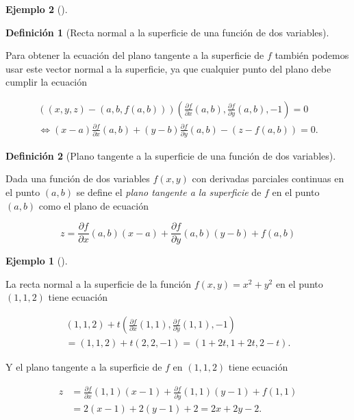 \documentclass[
  a4paper,
]{scrreport}
\theoremstyle{definition}
\newtheorem{example}{Ejemplo}[chapter]
\theoremstyle{plain}
\theoremstyle{definition}
\newtheorem{definition}{Definición}[chapter]
\theoremstyle{definition}
\theoremstyle{plain}
\theoremstyle{plain}
\theoremstyle{remark}
\begin{document}
\begin{example}[]
\begin{definition}[Recta normal a la superficie de una función de dos
variables]
\end{definition}

Para obtener la ecuación del plano tangente a la superficie de \(f\)
también podemos usar este vector normal a la superficie, ya que
cualquier punto del plano debe cumplir la ecuación

\[
\begin{gathered}
((x,y,z)-(a,b,f(a,b)))\left(\frac{\partial f}{\partial x}(a,b), \frac{\partial f}{\partial y}(a,b), -1\right) = 0 \\
\Leftrightarrow (x-a)\frac{\partial f}{\partial x}(a,b) + (y-b)\frac{\partial f}{\partial y}(a,b) - (z-f(a,b)) = 0.
\end{gathered}
\]

\begin{definition}[Plano tangente a la superficie de una función de dos
variables]\protect\hypertarget{def-plano-tangente-superficie}{}\label{def-plano-tangente-superficie}

Dada una función de dos variables \(f(x,y)\) con derivadas parciales
continuas en el punto \((a,b)\) se define el \emph{plano tangente a la
superficie} de \(f\) en el punto \((a,b)\) como el plano de ecuación

\[
z = \frac{\partial f}{\partial x}(a,b)(x-a) + \frac{\partial f}{\partial y}(a,b)(y-b)+f(a,b)
\]

\end{definition}

\begin{example}[]\protect\hypertarget{exm-recta-normal-plano-tangente}{}\label{exm-recta-normal-plano-tangente}

La recta normal a la superficie de la función \(f(x,y)=x^2+y^2\) en el
punto \((1,1,2)\) tiene ecuación

\[
\begin{gathered}
(1,1,2)+ t \left(\frac{\partial f}{\partial x}(1,1), \frac{\partial f}{\partial y}(1,1), -1\right) \\
= (1,1,2)+ t (2,2,-1) = (1+2t,1+2t,2-t).
\end{gathered}
\]

Y el plano tangente a la superficie de \(f\) en \((1,1,2)\) tiene
ecuación

\begin{align*}
z 
&= \frac{\partial f}{\partial x}(1,1)(x-1) + \frac{\partial f}{\partial y}(1,1)(y-1)+f(1,1) \\
&= 2(x-1) + 2(y-1) + 2 =  2x+2y-2.
\end{align*}


\end{example}
\end{example}
\end{document}
